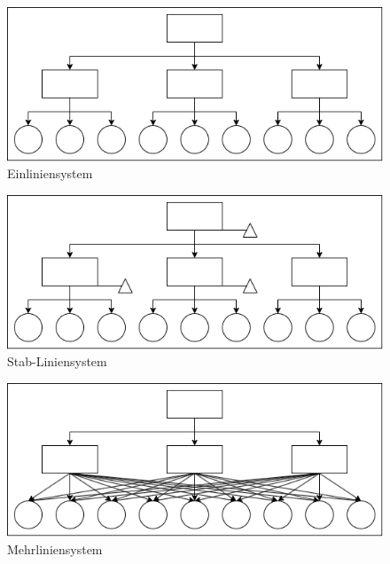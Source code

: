 \begin{figure}[H]
    \centering
    \includegraphics[width=\textwidth]{figures/einliniensystem.png}
    \caption{Einliniensystem}
    \label{fig:einliniensystem}
\end{figure}
\FloatBarrier

\begin{figure}[H]
    \centering
    \includegraphics[width=\textwidth]{figures/stabliniensystem.png}
    \caption{Stab-Liniensystem}
    \label{fig:stabliniensystem}
\end{figure}
\FloatBarrier

\begin{figure}[H]
    \centering
    \includegraphics[width=\textwidth]{figures/mehrliniensystem.png}
    \caption{Mehrliniensystem}
    \label{fig:mehrliniensystem}
\end{figure}
\FloatBarrier

